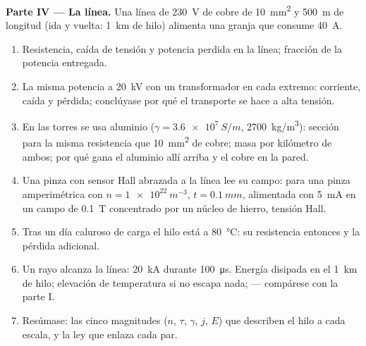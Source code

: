 \begin{problem}
\medskip
\noindent\textbf{Parte IV --- La línea.}
Una línea de \qty{230}{V} de cobre de \qty{10}{mm^2} y \qty{500}{m} de longitud (ida y vuelta:
\qty{1}{km} de hilo) alimenta una granja que consume \qty{40}{A}.
\begin{enumerate}[resume]
  \item Resistencia, caída de tensión y potencia perdida en la línea;
        fracción de la potencia entregada.
  \item La misma potencia a \qty{20}{kV} con un transformador en cada
        extremo: corriente, caída y pérdida; conclúyase por qué el
        transporte se hace a alta tensión.
  \item En las torres se usa aluminio ($\gamma = \qty{3.6e7}{S/m}$,
        \qty{2700}{kg/m^3}): sección para la misma resistencia que
        \qty{10}{mm^2} de cobre; masa por kilómetro de ambos; por qué gana
        el aluminio allí arriba y el cobre en la pared.
  \item Una pinza con sensor Hall abrazada a la línea lee su campo: para
        una pinza amperimétrica con $n = \qty{1e22}{m^{-3}}$, $t = \qty{0.1}{mm}$, alimentada con
        \qty{5}{mA} en un campo de \qty{0.1}{T} concentrado por un núcleo
        de hierro, tensión Hall.
  \item Tras un día caluroso de carga el hilo está a \qty{80}{\degreeCelsius}:
        su resistencia entonces y la pérdida adicional.
  \item Un rayo alcanza la línea: \qty{20}{kA} durante \qty{100}{\micro s}.
        Energía disipada en el \qty{1}{km} de hilo; elevación de
        temperatura si no escapa nada;  --- compárese
        con la parte I.
  \item Resúmase: las cinco magnitudes ($n$, $\tau$, $\gamma$, $j$, $E$) que
        describen el hilo a cada escala, y la ley que enlaza cada par.
\end{enumerate}
\end{problem}
